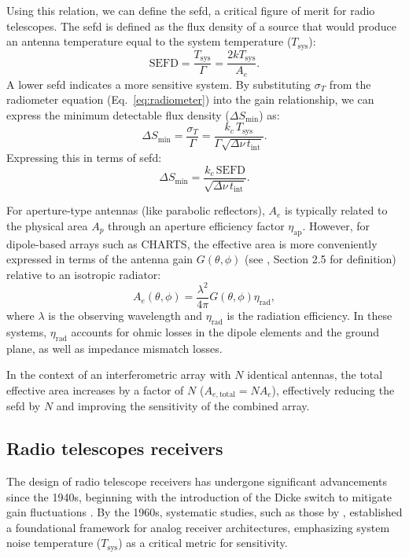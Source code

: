 Using this relation, we can define the \gls{sefd}, a critical figure of merit for radio telescopes. The \gls{sefd} is defined as the flux density of a source that would produce an antenna temperature equal to the system temperature ($T_\text{sys}$):
\begin{equation}
    \text{SEFD} = \frac{T_\text{sys}}{\Gamma} = \frac{2 k T_\text{sys}}{A_e}.
\end{equation}
A lower \gls{sefd} indicates a more sensitive system. By substituting $\sigma_T$ from the radiometer equation (Eq.\ \ref{eq:radiometer}) into the gain relationship, we can express the minimum detectable flux density ($\Delta S_{\text{min}}$) as:
\begin{equation}
    \Delta S_{\text{min}} = \frac{\sigma_T}{\Gamma} = \frac{k_c \, T_\text{sys}}{\Gamma \sqrt{\Delta \nu \, t_\text{int}}}.
\end{equation}
Expressing this in terms of \gls{sefd}:
\begin{equation}
    \Delta S_{\text{min}} = \frac{k_c \, \text{SEFD}}{\sqrt{\Delta \nu \, t_\text{int}}}.
    \label{eq:sensitivity_sefd}
\end{equation}

For aperture-type antennas (like parabolic reflectors), $A_e$ is typically related to the physical area $A_p$ through an aperture efficiency factor $\eta_{\text{ap}}$. However, for dipole-based arrays such as CHARTS, the effective area is more conveniently expressed in terms of the antenna gain $G(\theta, \phi)$ (see \citealt{stutzman2012antenna}, Section 2.5 for definition) relative to an isotropic radiator:
\begin{equation}
    A_e(\theta, \phi) = \frac{\lambda^2}{4\pi} G(\theta, \phi) \eta_{\text{rad}},
\end{equation}
where $\lambda$ is the observing wavelength and $\eta_{\text{rad}}$ is the radiation efficiency. In these systems, $\eta_{\text{rad}}$ accounts for ohmic losses in the dipole elements and the ground plane, as well as impedance mismatch losses. 

In the context of an interferometric array with $N$ identical antennas, the total effective area increases by a factor of $N$ ($A_{e, \text{total}} = N A_e$), effectively reducing the \gls{sefd} by $N$ and improving the sensitivity of the combined array.

\subsection{Radio telescopes receivers}
The design of radio telescope receivers has undergone significant advancements since the 1940s, beginning with the introduction of the Dicke switch to mitigate gain fluctuations \citep{dicke1946}. By the 1960s, systematic studies, such as those by \citet{tiuri1964}, established a foundational framework for analog receiver architectures, emphasizing system noise temperature ($T_{\text{sys}}$) as a critical metric for sensitivity. 

